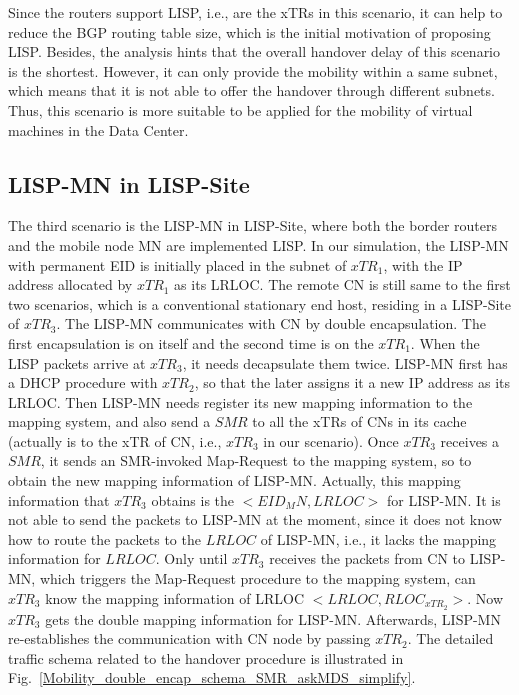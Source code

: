 Since the routers support LISP, i.e., are the xTRs in this scenario, it can help to reduce the BGP routing table size, which is the initial motivation of proposing LISP. Besides, the analysis hints that the overall handover delay of this scenario is the shortest. However, it can only provide the mobility within a same subnet, which means that it is not able to offer the handover through different subnets. Thus, this scenario is more suitable to be applied for the mobility of virtual machines in the Data Center.

\subsection{LISP-MN in LISP-Site}
\label{sec:ns3_analysis_lispmn_xTR}
The third scenario is the LISP-MN in LISP-Site, where both the border routers and the mobile node MN are implemented LISP. In our simulation, the LISP-MN with permanent EID is initially placed in the subnet of $xTR_1$, with the IP address allocated by $xTR_1$ as its LRLOC. The remote CN is still same to the first two scenarios, which is a conventional stationary end host, residing in a LISP-Site of $xTR_3$. The LISP-MN communicates with CN by double encapsulation. The first encapsulation is on itself and the second time is on the $xTR_1$. When the LISP packets arrive at $xTR_3$, it needs decapsulate them twice. %
LISP-MN first has a DHCP procedure with $xTR_2$, so that the later assigns it a new IP address as its LRLOC. Then LISP-MN needs register its new mapping information to the mapping system, and also send a $SMR$ to all the xTRs of CNs in its cache (actually is to the xTR of CN, i.e., $xTR_3$ in our scenario). Once $xTR_3$ receives a $SMR$, it sends an SMR-invoked Map-Request to the mapping system, so to obtain the new mapping information of LISP-MN. Actually, this mapping information that $xTR_3$ obtains is the $<EID_MN, LRLOC>$ for LISP-MN. It is not able to send the packets to LISP-MN at the moment, since it does not know how to route the packets to the $LRLOC$ of LISP-MN, i.e., it lacks the mapping information for $LRLOC$. Only until $xTR_3$ receives the packets from CN to LISP-MN, which triggers the Map-Request procedure to the mapping system, can $xTR_3$ know the mapping information of LRLOC $<LRLOC, RLOC_{xTR_2}>$. Now $xTR_3$ gets the double mapping information for LISP-MN. Afterwards, LISP-MN re-establishes  the communication with CN node by passing $xTR_2$. The detailed traffic schema related to the handover procedure is illustrated in Fig.~\ref{Mobility_double_encap_schema_SMR_askMDS_simplify}.
